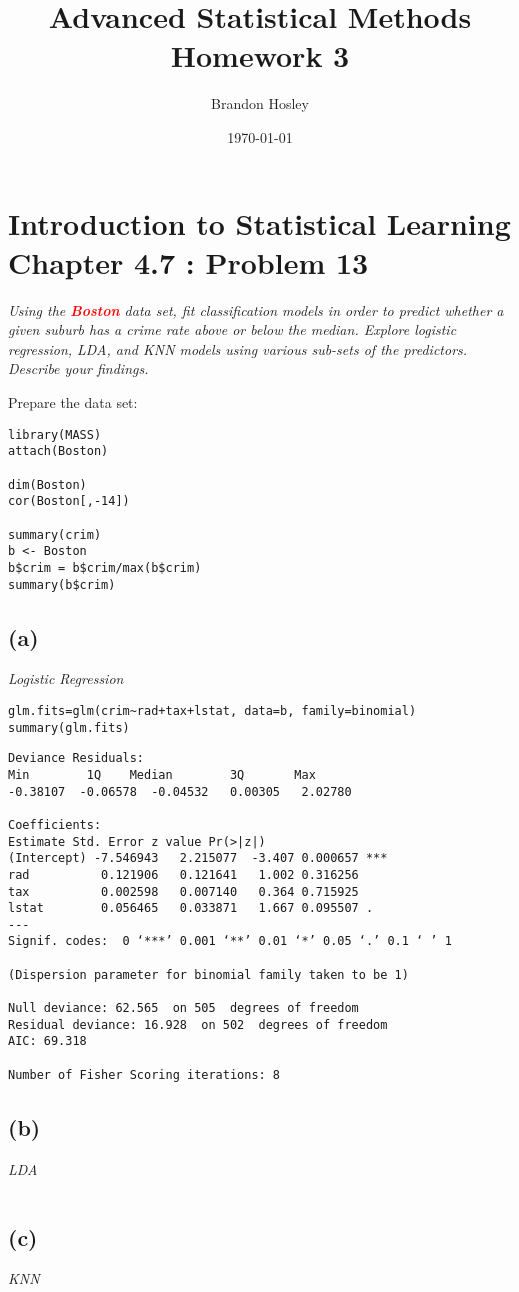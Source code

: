\documentclass[a4paper,man,natbib]{apa6}
\title{Advanced Statistical Methods Homework 3}
\author{Brandon Hosley}
\date{\today}
\affiliation{University of Illinois - Springfield}
\begin{document}
\maketitle
\singlespacing

\section{Introduction to Statistical Learning \\ Chapter 4.7 : Problem 13}
\emph{
Using the \textbf{\textcolor{red}{Boston}} data set, 
fit classification models in order to predict
whether a given suburb has a crime rate above or below the median.
Explore logistic regression, LDA, and KNN models using various sub-sets of the predictors. Describe your findings.}

Prepare the data set:

\begin{verbatim}
library(MASS)
attach(Boston)

dim(Boston)
cor(Boston[,-14])

summary(crim)
b <- Boston
b$crim = b$crim/max(b$crim)
summary(b$crim)
\end{verbatim}

\subsection{(a)} 
\emph{Logistic Regression}
\begin{verbatim}
glm.fits=glm(crim~rad+tax+lstat, data=b, family=binomial)
summary(glm.fits)
\end{verbatim}

\begin{verbatim}
Deviance Residuals: 
Min        1Q    Median        3Q       Max  
-0.38107  -0.06578  -0.04532   0.00305   2.02780  

Coefficients:
Estimate Std. Error z value Pr(>|z|)    
(Intercept) -7.546943   2.215077  -3.407 0.000657 ***
rad          0.121906   0.121641   1.002 0.316256    
tax          0.002598   0.007140   0.364 0.715925    
lstat        0.056465   0.033871   1.667 0.095507 .  
---
Signif. codes:  0 ‘***’ 0.001 ‘**’ 0.01 ‘*’ 0.05 ‘.’ 0.1 ‘ ’ 1

(Dispersion parameter for binomial family taken to be 1)

Null deviance: 62.565  on 505  degrees of freedom
Residual deviance: 16.928  on 502  degrees of freedom
AIC: 69.318

Number of Fisher Scoring iterations: 8
\end{verbatim}

\subsection{(b)}
\emph{LDA}
\begin{verbatim}
\end{verbatim}

\subsection{(c)}
\emph{KNN}
\begin{verbatim}
\end{verbatim}
	
\end{document}
